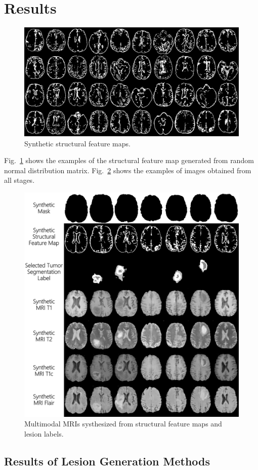 \documentclass[letterpaper]{article} %
\begin{document}
\section{Results}
\begin{figure}
	\centering
	\includegraphics[width=0.65\linewidth]{figures/Fs}
	\caption{Synthetic structural feature maps.}
	\label{generated_f}
\end{figure}
Fig.~\ref{generated_f} shows the examples of the structural feature map generated from random normal distribution matrix. Fig.~\ref{generated_mri} shows the examples of images obtained from all stages.
\begin{figure}
	\centering
	\includegraphics[width=0.65\linewidth]{figures/F_to_MRI}
	\caption{Multimodal MRIs systhesized from structural feature maps and lesion labels.}
	\label{generated_mri}
\end{figure}
\subsection{Results of Lesion Generation Methods}
\begin{table}[t]
	\caption{Lesion generation methods experiments.}\smallskip
	\centering
	\label{label_test}	
\end{table}
\end{document}
